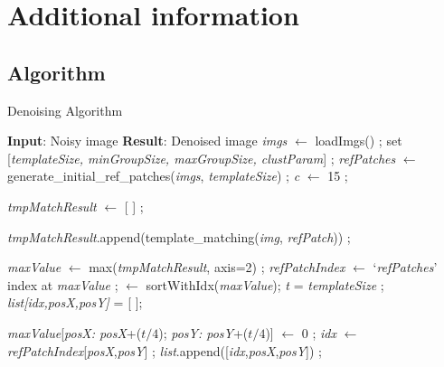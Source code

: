 \documentclass[fleqn,10pt]{wlscirep}
\begin{document}
\section*{Additional information}

\subsection*{Algorithm}
\label{algorithms}

\begin{algorithm}
	\caption{Denoising Algorithm}
	\label{algorithm:denoising_algorithm}
	\begin{algorithmic}[1]
		\State \textbf{Input}: Noisy image
		\State \textbf{Result}: Denoised image
		\State \textit{imgs} $\gets$ loadImgs() ;
		\State set [\textit{templateSize, minGroupSize, maxGroupSize, clustParam}] ;
		\State \textit{refPatches} $\gets$ generate\_initial\_ref\_patches(\textit{imgs}, \textit{templateSize}) ;
		\State \textit{c} $\gets$ 15 ;
		
		
		\State \textit{tmpMatchResult} $\gets$ [ ]	;		
		
		
		\State \textit{tmpMatchResult}.append(template\_matching(\textit{img}, \textit{refPatch})) ;
		
		\EndFor
		\EndFor
		
		\State \textit{maxValue} $\gets$ max(\textit{tmpMatchResult}, axis=2) ;
		\State \textit{refPatchIndex} $\gets$ `\textit{refPatches}' index at \textit{maxValue} ;
		 $\gets$ sortWithIdx(\textit{maxValue}); 
		\State \textit{t} = \textit{templateSize} ;
		\State \textit{list[\textit{idx},\textit{posX},\textit{posY}]} = [ ];
		
		\State \textit{maxValue}[\textit{posX: posX}+($t/4$); \textit{posY: posY}+($t/4$)] $\gets$ 0 ;
		\State \textit{idx} $\gets$ \textit{refPatchIndex}[\textit{posX},\textit{posY}] ;
		\State \textit{list}.append([\textit{idx},\textit{posX},\textit{posY}]) ;
		\EndIf
		\EndFor
		

\end{algorithmic}
\end{algorithm}
\end{document}
